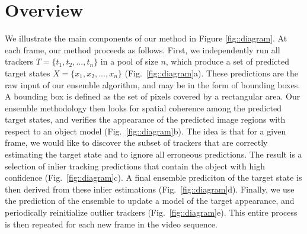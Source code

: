 \section{Overview}

We illustrate the main components of our method in
Figure \ref{fig::diagram}.
At each frame, our method proceeds as follows.
First, we independently run all trackers
$T = \{ t_1, t_2, ..., t_n \}$
in a pool of size $n$, which produce a set of predicted target
states
$X = \{ x_1, x_2, ..., x_n \}$ (Fig.~\ref{fig::diagram}a).
These predictions are the raw input of our ensemble algorithm,
and may be in the form of bounding boxes. A bounding box is defined as the
set of pixels covered by a rectangular area.
Our ensemble methodology then looks for spatial coherence among the predicted
target states, and verifies the appearance of the predicted image regions
with respect to an object model
(Fig.~\ref{fig::diagram}b). The idea is that for a given frame,
we would like to discover the subset of trackers that are correctly
estimating the target state and to ignore all erroneous predictions.
The result is a selection of inlier tracking predictions
that contain the object with high confidence
(Fig.~\ref{fig::diagram}c).
A final ensemble prediciton of the target state is then derived from
these inlier estimations (Fig.~\ref{fig::diagram}d).
Finally, we use the prediction of the ensemble to update a model of the
target appearance, and periodically reinitialize outlier trackers
(Fig.~\ref{fig::diagram}e).
This entire process is then repeated for each new frame in the video sequence.

